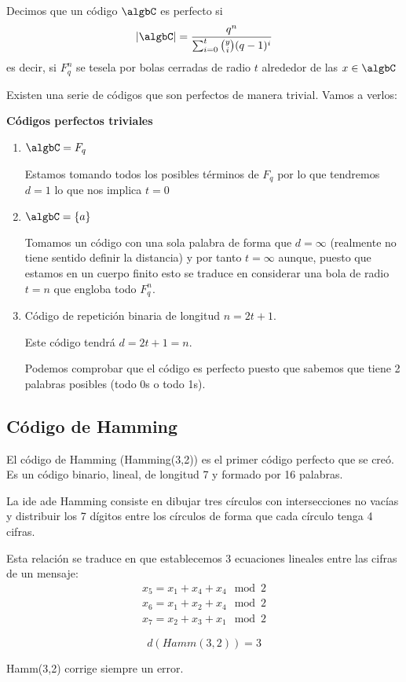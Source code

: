 \begin{defn}
Decimos que un código $\algbC$ es perfecto si
\[|\algbC| = \frac{q^n}{\sum_{i=0}^t {y \choose i} (q-1)^i}\]
es decir, si $F_q^n$ se tesela por bolas cerradas de radio $t$ alrededor de las $x \in \algbC$
\end{defn}

Existen una serie de códigos que son perfectos de manera trivial. Vamos a verlos:

\textbf{Códigos perfectos triviales}
\begin{enumerate}
\item $\algbC=F_q$

Estamos tomando todos los posibles términos de $F_q$ por lo que tendremos $d=1$ lo que nos implica $t=0$

\item $\algbC=\{a\}$

Tomamos un código con una sola palabra de forma que $d=\infty$ (realmente no tiene sentido definir la distancia) y por tanto $t=\infty$ aunque, puesto que estamos en un cuerpo finito esto se traduce en considerar una bola de radio $t=n$ que engloba todo $F_q^n$.

\item Código de repetición binaria de longitud $n=2t+1$.

Este código tendrá $d=2t+1 =n$.

Podemos comprobar que el código es perfecto puesto que sabemos que tiene 2 palabras posibles (todo 0s o todo 1s).

\end{enumerate}

\subsection{Código de Hamming}
\begin{defn}
El código de Hamming (Hamming(3,2)) es el primer código perfecto que se creó. Es un código binario, lineal, de longitud 7 y formado por 16 palabras.
\end{defn}

La ide ade Hamming consiste en dibujar tres círculos con intersecciones no vacías y distribuir los 7 dígitos entre los círculos de forma que cada círculo tenga 4 cifras.

Esta relación se traduce en que establecemos 3 ecuaciones lineales entre las cifras de un mensaje:
\[\begin{array}{l}x_5=x_1+x_4+x_4 \mod 2 \\ x_6=x_1+x_2+x_4 \mod 2 \\ x_7=x_2+x_3+x_1 \mod 2 \end{array}\]

\begin{prop}
\[d(Hamm(3,2))=3\]
\end{prop}
\begin{corol}
Hamm(3,2) corrige siempre un error.
\end{corol}